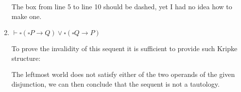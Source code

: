 \documentclass[11pt]{exam}
\begin{document}
\begin{enumerate}
    The box from line 5 to line 10 should be dashed, yet I had no idea how to make one.
    \item \begin{center}
        \(\vdash \square (\square P \rightarrow Q) \vee \square (\square Q \rightarrow P)\)
    \end{center}
    To prove the invalidity of this sequent it is sufficient to provide such Kripke structure:
    \begin{center}
    \end{center}
    The leftmost world does not satisfy either of the two operands of the given disjunction, we can then conclude that the sequent is not a tautology.
\end{enumerate}
\end{document}
